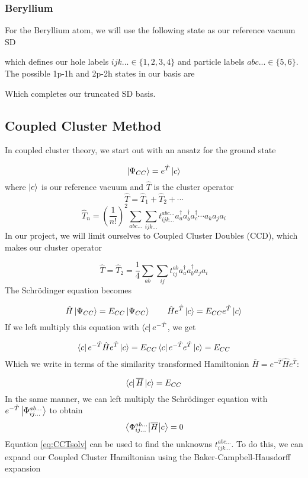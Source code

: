 \documentclass[a4paper,12pt]{article}
\begin{document}
\subsubsection{Beryllium}
\label{sec:Bery}
For the Beryllium atom, we will use the following state as our reference vacuum SD

which defines our hole labels $ijk... \in \{1,2,3,4\}$ and particle labels $abc... \in \{5,6\}$. The possible 1p-1h and 2p-2h states in our basis are 

Which completes our truncated SD basis.



\subsection{Coupled Cluster Method}
\label{sec:CCD}
In coupled cluster theory, we start out with an ansatz for the ground state

\begin{equation}
    \label{eq:CCTGroundstateAnsatz}
    \ket{\Psi_{CC}} = e^{\hat{T}}\ket{c}
\end{equation}
where $\ket{c}$ is our reference vacuum and $\hat{T}$ is the cluster operator
$$\hat{T} = \hat{T}_1 + \hat{T}_2 + \cdots $$
$$\hat{T}_n = \left( \frac{1}{n!}\right)^2 \sum_{abc...} \sum_{ijk...} t_{ijk...}^{abc...}a^\dagger_aa_b^\dagger a_c^\dagger \cdots a_ka_ja_i$$
In our project, we will limit ourselves to Coupled Cluster Doubles (CCD), which makes our cluster operator

\begin{equation}
    \label{eq:CCDOperator}
    \hat{T} = \hat{T}_2 = \frac{1}{4}\sum_{ab} \sum_{ij} t_{ij}^{ab}a^\dagger_a a^\dagger_b a_j a_i 
\end{equation}
The Schrödinger equation becomes 

\begin{equation}
    \label{eq:SE}
    \hat{H}\ket{\Psi_{CC}} = E_{CC}\ket{\Psi_{CC}} \qquad \hat{H} e^{\hat{T}}\ket{c} = E_{CC} e^{\hat{T}}\ket{c}
\end{equation}
If we left multiply this equation with $\bra{c} e^{-\hat{T}}$, we get

$$\bra{c}e^{-\hat{T}} \hat{H} e^{\hat{T}} \ket{c} = E_{CC}\bra{c} e^{-\hat{T}}e^{\hat{T}} \ket{c} = E_{CC}$$
Which we write in terms of the similarity transformed Hamiltonian $\overline{H} = e^{-\hat{T}} \hat{H} e^{\hat{T}}$:

\begin{equation}
    \bra{c} \overline{H} \ket{c} = E_{CC}
\end{equation}
In the same manner, we can left multiply the Schrödinger equation with $e^{-\hat{T}} \ket{\Phi_{ij...}^{ab...}}$ to obtain
\begin{equation}
    \label{eq:CCTsolv}
    \mel{\Phi_{ij...}^{ab...}}{\overline{H}}{c} = 0
\end{equation}
Equation \ref{eq:CCTsolv} can be used to find the unknowns $t^{abc...}_{ijk...}$. To do this, we can expand our Coupled Cluster Hamiltonian using the Baker-Campbell-Hausdorff expansion
\end{document}
